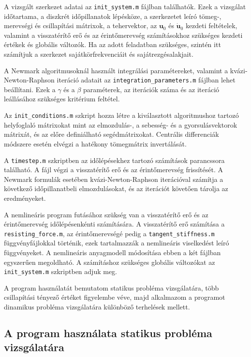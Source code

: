  A vizsgált szerkezet adatai az \verb|init_system.m| fájlban találhatók. Ezek a vizsgálat időtartama, a diszkrét időpillanatok lépésköze, a szerkezetet leíró tömeg-, merevségi és csillapítási mátrixok, a tehervektor,  az $\mathbf{u}_0$ és  $\mathbf{\dot{u}}_0$  kezdeti feltételek, valamint a visszatérítő erő és az érintőmerevség számításokhoz szükséges kezdeti értékek és globális változók. Ha az adott feladatban szükséges, szintén itt számítjuk a szerkezet sajátkörfrekvenciáit és sajátrezgésalakjait.
 
 A Newmark algoritmusoknál használt integrálási paramétereket, valamint  a kvázi-Newton-Raphson iteráció adatait  az \verb|integration_parameters.m| fájlban lehet beállítani.  Ezek a $\gamma$ és a $\beta$ paraméterek,  az iterációk száma és az iteráció leállásához szükséges  kritérium feltétel. 
 
 Az \verb|init_conditions.m| szkript hozza létre a kiválasztott algoritmushoz tartozó helyfoglaló mátrixokat mint az elmozdulás-, a sebesség- és a gyorsulásvektorok mátrixát, és az  előre definiálható segédmátrixokat. Centrális differenciák módszere esetén elvégzi a hatékony tömegmátrix invertálását.
 
 A \verb|timestep.m| szkriptben az időlépésekhez tartozó számítások parancssora található. A fájl végzi a visszatérítő erő és  az érintőmerevség frissítését. A Newmark formulák esetében kvázi-Newton-Raphson iterációval számítja a következő  időpillanatbeli elmozdulásokat, és az iterációt követően  tárolja  az eredményeket.

A nemlineáris program futásához szükség van a visszatérítő erő és az érintőmerevség időlépésenkénti számítására. A visszatérítő erő számítása a  \verb|resisting_force.m|, az érintőmerevségé pedig a  \verb|tangent_stiffness.m| függvényfájlokkal történik, ezek tartalmazzák  a nemlineáris  viselkedést leíró függvényeket. A nemlineáris anyagmodell módosítása  ebben a két fájlban egyszerűen megoldható. A számításhoz szükséges globális változókat az \verb|init_system.m| szkriptben adjuk meg.

A program használatát bemutatom statikus probléma vizsgálatára, több csillapítási tényező értéket figyelembe véve, majd  alkalmazom a programot dinamikus probléma vizsgálatára különböző terhelések mellett. 
 
\subsection{A program használata statikus  probléma vizsgálatára} \label{subsec:nemlinstat}

